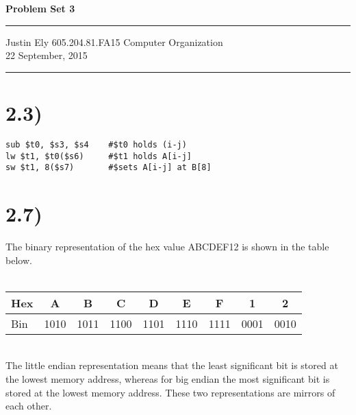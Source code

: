 \documentclass[a4paper,11pt]{article}
\begin{document}
\begin{flushright}

\vspace{1.1cm}

{\bf\Huge Problem Set 3}

\rule{0.25\linewidth}{0.5pt}

\vspace{0.5cm}
Justin Ely
\linebreak
\newline
\footnotesize{605.204.81.FA15 Computer Organization\\}
\vspace{0.5cm}
22 September, 2015
\end{flushright}

\noindent\rule{\linewidth}{1.0pt}



\section*{2.3)}

\begin{verbatim}
sub $t0, $s3, $s4    #$t0 holds (i-j)
lw $t1, $t0($s6)     #$t1 holds A[i-j]
sw $t1, 8($s7)       #$sets A[i-j] at B[8]
\end{verbatim}


\section*{2.7)} 
\noindent The binary representation of the hex value ABCDEF12 is shown in the table below. \\
\\
\begin{tabular}{| l | c | c | c | c | c | c | c | c |}
  \hline	
  Hex & A & B & C & D & E & F & 1 & 2 \\  \hline  		
  Bin & 1010 & 1011 & 1100 & 1101 & 1110 & 1111 & 0001 & 0010 \\ \hline
\end{tabular} \\

The little endian representation means that the least significant bit is stored at the lowest memory address, whereas for big endian the most significant bit is stored at the lowest memory address.  These two representations are mirrors of each other. \\
\end{document}
